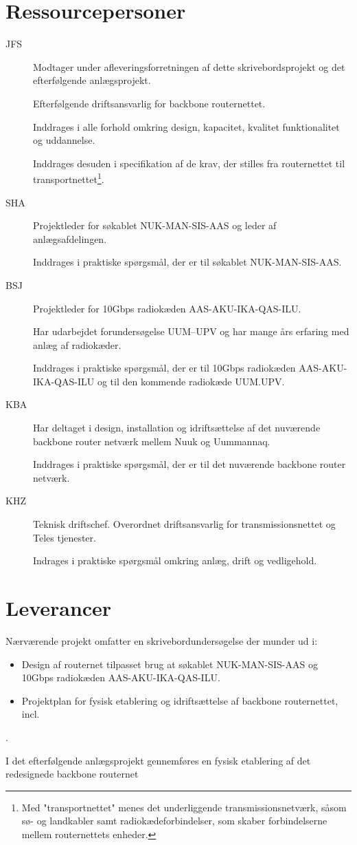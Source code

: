\documentclass[11pt,a4paper]{article}
\begin{document}
\section{Ressourcepersoner}
\begin{description}
\item[JFS]
Modtager under afleveringsforretningen af dette skrivebordsprojekt og det efterfølgende anlægsprojekt.
\par
Efterfølgende driftsansvarlig for backbone routernettet.
\par
Inddrages i alle forhold omkring design, kapacitet, kvalitet funktionalitet og uddannelse.
\par
Inddrages desuden i specifikation af de krav, der stilles fra routernettet til transportnettet\footnote{Med "transportnettet" menes det underliggende transmissionsnetværk, såsom sø- og landkabler samt radiokædeforbindelser, som skaber forbindelserne mellem routernettets enheder.}.
\item[SHA]
Projektleder for søkablet NUK-MAN-SIS-AAS og leder af anlægsafdelingen.
\par
Inddrages i praktiske spørgsmål, der er til søkablet NUK-MAN-SIS-AAS.
\item[BSJ]
Projektleder for 10Gbps radiokæden AAS-AKU-IKA-QAS-ILU.
\par
Har udarbejdet forundersøgelse UUM–UPV og har mange års erfaring med anlæg af radiokæder.
\par
Inddrages i praktiske spørgsmål, der er til 10Gbps radiokæden AAS-AKU-IKA-QAS-ILU og til den kommende radiokæde UUM.UPV.
\item[KBA]
Har deltaget i design, installation og idriftsættelse af det nuværende backbone router netværk mellem Nuuk og Uummannaq.
\par
Inddrages i praktiske spørgsmål, der er til det nuværende backbone router netværk.
\item[KHZ]
Teknisk driftschef. Overordnet driftsansvarlig for transmissionsnettet og Teles tjenester.
\par
Indrages i praktiske spørgsmål omkring anlæg, drift og vedligehold.
\end{description}
\section{Leverancer}
Nærværende projekt omfatter en skrivebordundersøgelse der munder ud i:
\begin{itemize}
\item Design af routernet tilpasset brug at søkablet NUK-MAN-SIS-AAS og 10Gbps radiokæden AAS-AKU-IKA-QAS-ILU.
\item Projektplan for fysisk etablering og idriftsættelse af backbone routernettet, incl.
\end{itemize}.
\par
I det efterfølgende anlægsprojekt gennemføres en fysisk etablering af det redesignede backbone routernet
\end{document}
